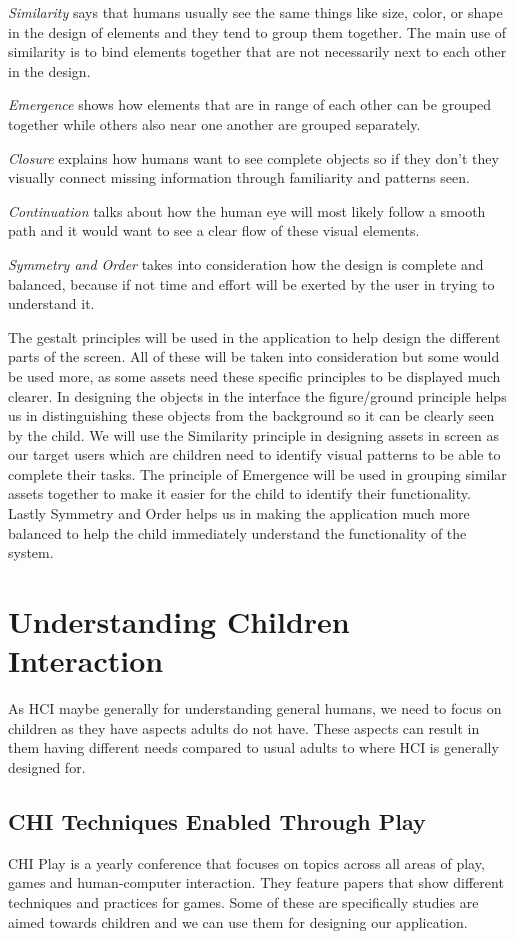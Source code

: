 \textit{Similarity} says that humans usually see the same things like size, color, or shape in the design of elements and they tend to group them together. The main use of similarity is to bind elements together that are not necessarily next to each other in the design.

\textit{Emergence} shows how elements that are in range of each other can be grouped together while others also near one another are grouped separately.

\textit{Closure} explains how humans want to see complete objects so if they don't they visually connect missing information through familiarity and patterns seen.

\textit{Continuation} talks about how the human eye will most likely follow a smooth path and it would want to see a clear flow of these visual elements.

\textit{Symmetry and Order} takes into consideration how the design is complete and balanced, because if not time and effort will be exerted by the user in trying to understand it.

The gestalt principles will be used in the application to help design the different parts of the screen. All of these will be taken into consideration but some would be used more, as some assets need these specific principles to be displayed much clearer. In designing the objects in the interface the figure/ground principle helps us in distinguishing these objects from the background so it can be clearly seen by the child. We will use the Similarity principle in designing assets in screen as our target users which are children need to identify visual patterns to be able to complete their tasks. The principle of Emergence will be used in grouping similar assets together to make it easier for the child to identify their functionality. Lastly Symmetry and Order helps us in making the application much more balanced to help the child immediately understand the functionality of the system.

\section{Understanding Children Interaction}
As HCI maybe generally for understanding general humans, we need to focus on children as they have aspects adults do not have. These aspects can result in them having different needs compared to usual adults to where HCI is generally designed for. 

\subsection{CHI Techniques Enabled Through Play}
 CHI Play is a yearly conference that focuses on topics across all areas of play, games and human-computer interaction. They feature papers that show different techniques and practices for games. Some of these are specifically studies are aimed towards children and we can use them for designing our application.

